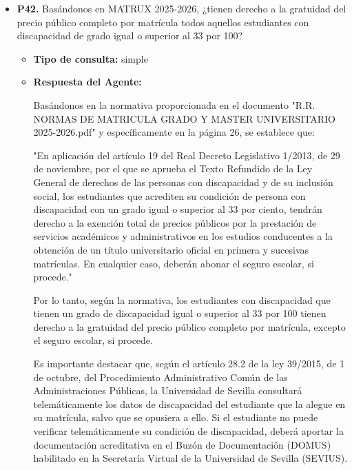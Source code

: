 \documentclass{article}
\begin{document}
\begin{itemize}
\begin{itemize}
\begin{scriptsize}
                  2. Los estudiantes tendrán derecho a presentarse a dos de las tres convocatorias ordinarias, salvo en el caso contemplado en el artículo 61.4 del Reglamento general de actividades docentes, que será de aplicación también en el ámbito de aplicación de esta disposición adicional.
                \end{scriptsize}
        \end{itemize}


  \item \textbf{P42.} Basándonos en MATRUX 2025-2026, ¿tienen derecho a la gratuidad del precio público completo por matrícula todos aquellos estudiantes con discapacidad de grado igual o superior al 33 por 100? \\
        \begin{itemize}
          \item \textbf{Tipo de consulta:} simple
          \item \textbf{Respuesta del Agente:}

                Basándonos en la normativa proporcionada en el documento "R.R. NORMAS DE MATRICULA GRADO Y MASTER UNIVERSITARIO 2025-2026.pdf" y específicamente en la página 26, se establece que:

                "En aplicación del artículo 19 del Real Decreto Legislativo 1/2013, de 29 de noviembre, por el que se aprueba el Texto Refundido de la Ley General de derechos de las personas con discapacidad y de su inclusión social, los estudiantes que acrediten su condición de persona con discapacidad con un grado igual o superior al 33 por ciento, tendrán derecho a la exención total de precios públicos por la prestación de servicios académicos y administrativos en los estudios conducentes a la obtención de un título universitario oficial en primera y sucesivas matrículas. En cualquier caso, deberán abonar el seguro escolar, si procede."

                Por lo tanto, según la normativa, los estudiantes con discapacidad que tienen un grado de discapacidad igual o superior al 33 por 100 tienen derecho a la gratuidad del precio público completo por matrícula, excepto el seguro escolar, si procede.

                Es importante destacar que, según el artículo 28.2 de la ley 39/2015, de 1 de octubre, del Procedimiento Administrativo Común de las Administraciones Públicas, la Universidad de Sevilla consultará telemáticamente los datos de discapacidad del estudiante que la alegue en su matrícula, salvo que se opusiera a ello. Si el estudiante no puede verificar telemáticamente su condición de discapacidad, deberá aportar la documentación acreditativa en el Buzón de Documentación (DOMUS) habilitado en la Secretaría Virtual de la Universidad de Sevilla (SEVIUS).


\end{itemize}
\end{itemize}
\end{document}
